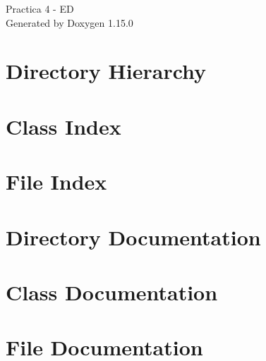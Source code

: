 \documentclass[twoside]{book}
\newcommand{\+}{\discretionary{\mbox{\scriptsize$\hookleftarrow$}}{}{}}
\newcommand{\clearemptydoublepage}{%
    \newpage{\pagestyle{empty}\cleardoublepage}%
  }
\begin{document}
  \raggedbottom
    \hypersetup{pageanchor=false,
                bookmarksnumbered=true,
                pdfencoding=unicode
               }
  \begin{titlepage}
  \vspace*{7cm}
  \begin{center}%
  {\Large Practica 4 -\/ ED}\\
  \vspace*{1cm}
  {\large Generated by Doxygen 1.15.0}\\
  \end{center}
  \end{titlepage}
  \clearemptydoublepage
  \tableofcontents
  \clearemptydoublepage
  \hypersetup{pageanchor=true}
\chapter{Directory Hierarchy}

\chapter{Class Index}

\chapter{File Index}

\chapter{Directory Documentation}


\chapter{Class Documentation}



\chapter{File Documentation}







  \backmatter
  \newpage
  \clearemptydoublepage
  \printindex
\end{document}
